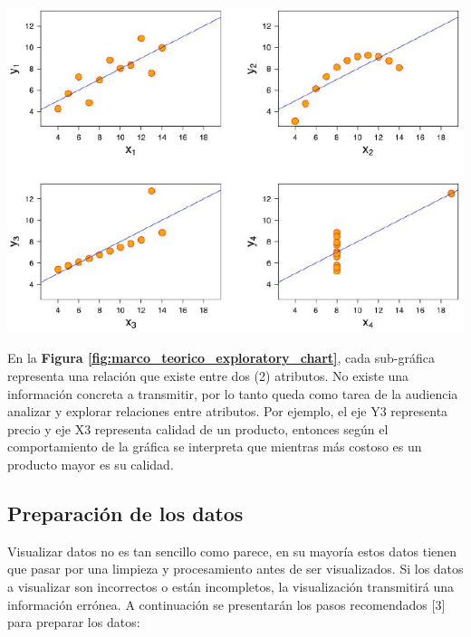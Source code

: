 \begin{center}
    \bigbreak
    \includegraphics[scale=0.45]{images/marco_teorico/exploratory_chart.png}
    \label{fig:marco_teorico_exploratory_chart}
    \bigbreak
\end{center}

En la \textbf{Figura \ref{fig:marco_teorico_exploratory_chart}}, cada sub-gráfica representa una relación que existe entre dos (2) atributos. No existe una información concreta a transmitir, por lo tanto queda como tarea de la audiencia analizar y explorar relaciones entre atributos. Por ejemplo, el eje Y3 representa precio y eje X3 representa calidad de un producto, entonces según el comportamiento de la gráfica se interpreta que mientras más costoso es un producto mayor es su calidad.

\subsection{Preparación de los datos}
Visualizar datos no es tan sencillo como parece, en su mayoría estos datos tienen que pasar por una limpieza y procesamiento antes de ser visualizados. Si los datos a visualizar son incorrectos o están incompletos, la visualización transmitirá una información errónea. A continuación se presentarán los pasos recomendados [3] para preparar los datos:

